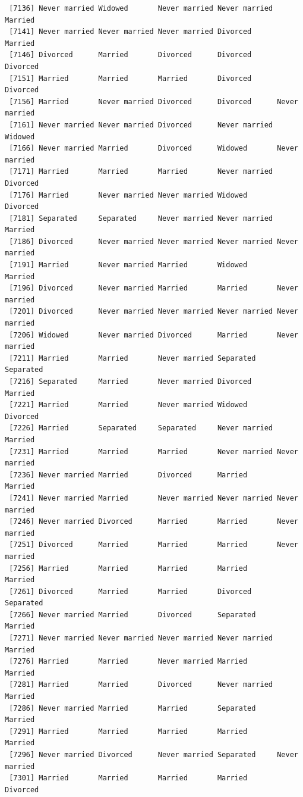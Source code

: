 \documentclass[
  letterpaper,
  DIV=11,
  numbers=noendperiod,
  oneside]{scrartcl}
\begin{document}
\begin{verbatim}
 [7136] Never married Widowed       Never married Never married Married      
 [7141] Never married Never married Never married Divorced      Married      
 [7146] Divorced      Married       Divorced      Divorced      Divorced     
 [7151] Married       Married       Married       Divorced      Divorced     
 [7156] Married       Never married Divorced      Divorced      Never married
 [7161] Never married Never married Divorced      Never married Widowed      
 [7166] Never married Married       Divorced      Widowed       Never married
 [7171] Married       Married       Married       Never married Divorced     
 [7176] Married       Never married Never married Widowed       Divorced     
 [7181] Separated     Separated     Never married Never married Married      
 [7186] Divorced      Never married Never married Never married Never married
 [7191] Married       Never married Married       Widowed       Married      
 [7196] Divorced      Never married Married       Married       Never married
 [7201] Divorced      Never married Never married Never married Never married
 [7206] Widowed       Never married Divorced      Married       Never married
 [7211] Married       Married       Never married Separated     Separated    
 [7216] Separated     Married       Never married Divorced      Married      
 [7221] Married       Married       Never married Widowed       Divorced     
 [7226] Married       Separated     Separated     Never married Married      
 [7231] Married       Married       Married       Never married Never married
 [7236] Never married Married       Divorced      Married       Married      
 [7241] Never married Married       Never married Never married Never married
 [7246] Never married Divorced      Married       Married       Never married
 [7251] Divorced      Married       Married       Married       Never married
 [7256] Married       Married       Married       Married       Married      
 [7261] Divorced      Married       Married       Divorced      Separated    
 [7266] Never married Married       Divorced      Separated     Married      
 [7271] Never married Never married Never married Never married Married      
 [7276] Married       Married       Never married Married       Married      
 [7281] Married       Married       Divorced      Never married Married      
 [7286] Never married Married       Married       Separated     Married      
 [7291] Married       Married       Married       Married       Married      
 [7296] Never married Divorced      Never married Separated     Never married
 [7301] Married       Married       Married       Married       Divorced     

\end{verbatim}
\end{document}
